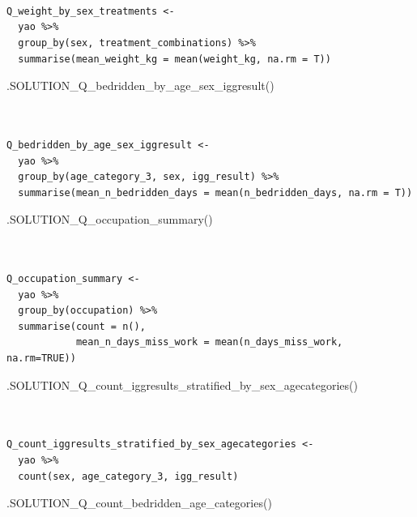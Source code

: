\documentclass[
  letterpaper,
  DIV=11,
  numbers=noendperiod]{scrreprt}
\newenvironment{Shaded}{\begin{snugshade}}{\end{snugshade}}
\newcommand{\FunctionTok}[1]{\textcolor[rgb]{0.28,0.35,0.67}{#1}}
\newcommand{\NormalTok}[1]{\textcolor[rgb]{0.00,0.23,0.31}{#1}}
\begin{document}
\begin{verbatim}


  
Q_weight_by_sex_treatments <- 
  yao %>% 
  group_by(sex, treatment_combinations) %>%
  summarise(mean_weight_kg = mean(weight_kg, na.rm = T))
\end{verbatim}

\begin{Shaded}
\begin{Highlighting}[]
\FunctionTok{.SOLUTION\_Q\_bedridden\_by\_age\_sex\_iggresult}\NormalTok{()}
\end{Highlighting}
\end{Shaded}

\begin{verbatim}


Q_bedridden_by_age_sex_iggresult <- 
  yao %>% 
  group_by(age_category_3, sex, igg_result) %>% 
  summarise(mean_n_bedridden_days = mean(n_bedridden_days, na.rm = T))
\end{verbatim}

\begin{Shaded}
\begin{Highlighting}[]
\FunctionTok{.SOLUTION\_Q\_occupation\_summary}\NormalTok{()}
\end{Highlighting}
\end{Shaded}

\begin{verbatim}


Q_occupation_summary <- 
  yao %>% 
  group_by(occupation) %>%
  summarise(count = n(),
            mean_n_days_miss_work = mean(n_days_miss_work, na.rm=TRUE))
\end{verbatim}

\begin{Shaded}
\begin{Highlighting}[]
\FunctionTok{.SOLUTION\_Q\_count\_iggresults\_stratified\_by\_sex\_agecategories}\NormalTok{()}
\end{Highlighting}
\end{Shaded}

\begin{verbatim}


Q_count_iggresults_stratified_by_sex_agecategories <- 
  yao %>% 
  count(sex, age_category_3, igg_result)
\end{verbatim}

\begin{Shaded}
\begin{Highlighting}[]
\FunctionTok{.SOLUTION\_Q\_count\_bedridden\_age\_categories}\NormalTok{()}
\end{Highlighting}
\end{Shaded}
\end{document}

